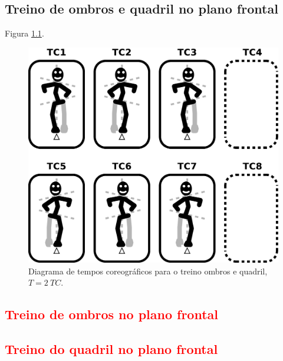 

\chapter{\textcolor{blue}{ \Bodycontrol}}



\section{ Treino de ombros e quadril no plano frontal}

Figura \ref{fig:pessoalombroquadril1}.

\begin{figure}[!h]
  \centering
    \includegraphics[width=\bodyboxsize]{chapters/cap-body-control/postura-ombro1.eps}
\caption{Diagrama de tempos coreográficos para o treino ombros e quadril, $T=2~TC$.}
\label{fig:pessoalombroquadril1}
\end{figure}

\section{\textcolor{red}{  Treino de ombros no plano frontal}}

\section{\textcolor{red}{  Treino do quadril no plano frontal}}


